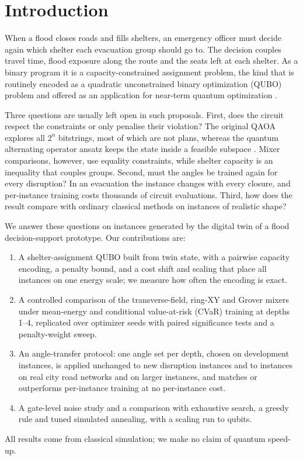 \documentclass[conference]{IEEEtran}
\begin{document}
\section{Introduction}
When a flood closes roads and fills shelters, an emergency officer must decide again which shelter each evacuation group should go to. The decision couples travel time, flood exposure along the route and the seats left at each shelter. As a binary program it is a capacity-constrained assignment problem, the kind that is routinely encoded as a quadratic unconstrained binary optimization (QUBO) problem \cite{Lucas2014,Glover2019} and offered as an application for near-term quantum optimization \cite{Cadelina2024,Abbas2024}.

Three questions are usually left open in such proposals. First, does the circuit respect the constraints or only penalise their violation? The original QAOA \cite{Farhi2014} explores all $2^n$ bitstrings, most of which are not plans, whereas the quantum alternating operator ansatz \cite{Hadfield2019} keeps the state inside a feasible subspace \cite{WangZ2020,Fuchs2022,Bartschi2020}. Mixer comparisons, however, use equality constraints, while shelter capacity is an inequality that couples groups. Second, must the angles be trained again for every disruption? In an evacuation the instance changes with every closure, and per-instance training costs thousands of circuit evaluations. Third, how does the result compare with ordinary classical methods on instances of realistic shape?

We answer these questions on instances generated by the digital twin of a flood decision-support prototype. Our contributions are:
\begin{enumerate}
\item A shelter-assignment QUBO built from twin state, with a pairwise capacity encoding, a penalty bound, and a cost shift and scaling that place all instances on one energy scale; we measure how often the encoding is exact.
\item A controlled comparison of the transverse-field, ring-XY and Grover mixers under mean-energy and conditional value-at-risk (CVaR) training at depths 1--4, replicated over \NSeeds{} optimizer seeds with paired significance tests and a penalty-weight sweep.
\item An angle-transfer protocol: one angle set per depth, chosen on development instances, is applied unchanged to new disruption instances and to instances on real city road networks and on larger instances, and matches or outperforms per-instance training at no per-instance cost.
\item A gate-level noise study and a comparison with exhaustive search, a greedy rule and tuned simulated annealing, with a scaling run to \ScaleMaxQ{} qubits.
\end{enumerate}
All results come from classical simulation; we make no claim of quantum speed-up.
\end{document}
